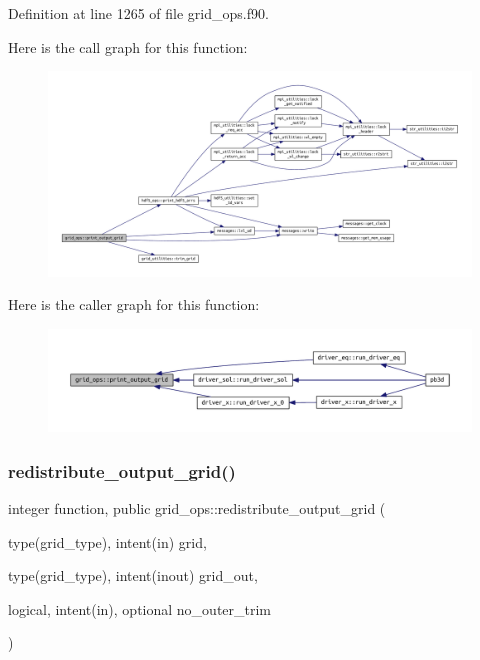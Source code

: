 Definition at line 1265 of file grid\+\_\+ops.\+f90.

Here is the call graph for this function\+:
\nopagebreak
\begin{figure}[H]
\begin{center}
\leavevmode
\includegraphics[width=350pt]{namespacegrid__ops_ab2a8efa54d36500efcabeb9f1aabbcc6_cgraph}
\end{center}
\end{figure}
Here is the caller graph for this function\+:
\nopagebreak
\begin{figure}[H]
\begin{center}
\leavevmode
\includegraphics[width=350pt]{namespacegrid__ops_ab2a8efa54d36500efcabeb9f1aabbcc6_icgraph}
\end{center}
\end{figure}
\mbox{\label{namespacegrid__ops_ab10ef5b486ee3861df2da4e53bc22630}} 
\subsubsection{\texorpdfstring{redistribute\+\_\+output\+\_\+grid()}{redistribute\_output\_grid()}}
{\footnotesize\ttfamily integer function, public grid\+\_\+ops\+::redistribute\+\_\+output\+\_\+grid (\begin{DoxyParamCaption}\item[{type(grid\+\_\+type), intent(in)}]{grid,  }\item[{type(grid\+\_\+type), intent(inout)}]{grid\+\_\+out,  }\item[{logical, intent(in), optional}]{no\+\_\+outer\+\_\+trim }\end{DoxyParamCaption})}



